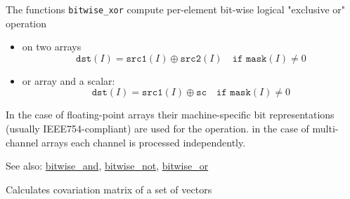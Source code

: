 The functions \texttt{bitwise\_xor} compute per-element bit-wise logical "exclusive or" operation

\begin{itemize}
    \item on two arrays
    \[\texttt{dst}(I) = \texttt{src1}(I) \oplus \texttt{src2}(I)\quad\texttt{if mask}(I)\ne0\]
    \item or array and a scalar:
    \[\texttt{dst}(I) = \texttt{src1}(I) \oplus \texttt{sc}\quad\texttt{if mask}(I)\ne0\]
\end{itemize}

In the case of floating-point arrays their machine-specific bit representations (usually IEEE754-compliant) are used for the operation. in the case of multi-channel arrays each channel is processed independently.

See also: \hyperref[cppfunc.bitwise.and]{bitwise\_and}, \hyperref[cppfunc.bitwise.not]{bitwise\_not}, \hyperref[cppfunc.bitwise.or]{bitwise\_or}

Calculates covariation matrix of a set of vectors


